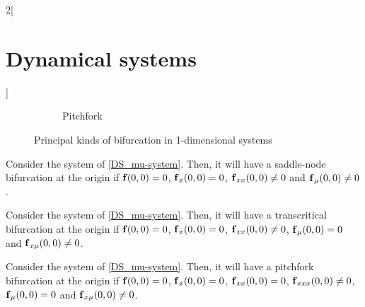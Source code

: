 \documentclass[../../../main_math.tex]{subfiles}
\begin{document}
\begin{multicols}{2}[\section{Dynamical systems}]
\begin{figure}[H]
\begin{subfigure}[b]{0.32\linewidth}
      \label{DS_trans}
    \end{subfigure}
    \hfill
    \begin{subfigure}[b]{0.32\linewidth}
      \centering
      
      \caption{Pitchfork}
      \label{DS_fork}
    \end{subfigure}
    \caption{Principal kinds of bifurcation in 1-dimensional systems}
  \end{figure}
  \begin{theorem}
    Consider the system of \cref{DS_mu-system}. Then, it will have a saddle-node bifurcation at the origin if $\boldsymbol{\mathrm{f}}(0,0)=0$, $\boldsymbol{\mathrm{f}}_x(0,0)=0$, $\boldsymbol{\mathrm{f}}_{xx}(0,0)\ne 0$ and $\boldsymbol{\mathrm{f}}_\mu(0,0)\ne0$.
  \end{theorem}
  \begin{theorem}
    Consider the system of \cref{DS_mu-system}. Then, it will have a transcritical bifurcation at the origin if $\boldsymbol{\mathrm{f}}(0,0)=0$, $\boldsymbol{\mathrm{f}}_x(0,0)=0$, $\boldsymbol{\mathrm{f}}_{xx}(0,0)\ne 0$, $\boldsymbol{\mathrm{f}}_\mu(0,0)=0$ and $\boldsymbol{\mathrm{f}}_{x\mu}(0,0)\ne 0$.
  \end{theorem}
  \begin{theorem}
    Consider the system of \cref{DS_mu-system}. Then, it will have a pitchfork bifurcation at the origin if $\boldsymbol{\mathrm{f}}(0,0)=0$, $\boldsymbol{\mathrm{f}}_x(0,0)=0$, $\boldsymbol{\mathrm{f}}_{xx}(0,0)=0$, $\boldsymbol{\mathrm{f}}_{xxx}(0,0)\ne 0$, $\boldsymbol{\mathrm{f}}_\mu(0,0)=0$ and $\boldsymbol{\mathrm{f}}_{x\mu}(0,0)\ne 0$.
  \end{theorem}

\end{multicols}
\end{document}
